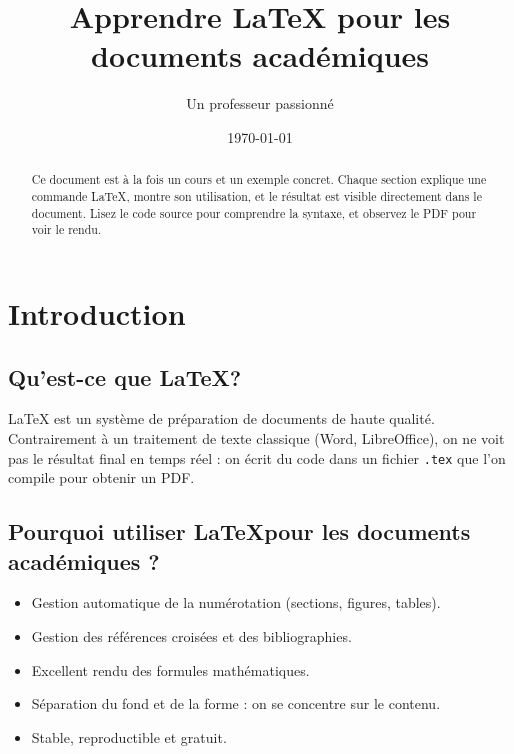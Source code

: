 \documentclass[a4paper,12pt]{article}
\title{\textbf{Apprendre \LaTeX{} pour les documents académiques}}
\author{Un professeur passionné}
\date{\today}
\begin{document}
\maketitle

\begin{abstract}
Ce document est à la fois un cours et un exemple concret. Chaque section explique une commande \LaTeX, montre son utilisation, et le résultat est visible directement dans le document. Lisez le code source pour comprendre la syntaxe, et observez le PDF pour voir le rendu.
\end{abstract}

\tableofcontents
\newpage

\section{Introduction}

\subsection{Qu'est-ce que \LaTeX ?}
\LaTeX{} est un système de préparation de documents de haute qualité. Contrairement à un traitement de texte classique (Word, LibreOffice), on ne voit pas le résultat final en temps réel : on écrit du code dans un fichier \texttt{.tex} que l'on compile pour obtenir un PDF.

\subsection{Pourquoi utiliser \LaTeX pour les documents académiques ?}
\begin{itemize}
    \item Gestion automatique de la numérotation (sections, figures, tables).
    \item Gestion des références croisées et des bibliographies.
    \item Excellent rendu des formules mathématiques.
    \item Séparation du fond et de la forme : on se concentre sur le contenu.
    \item Stable, reproductible et gratuit.
\end{itemize}

\end{document}
